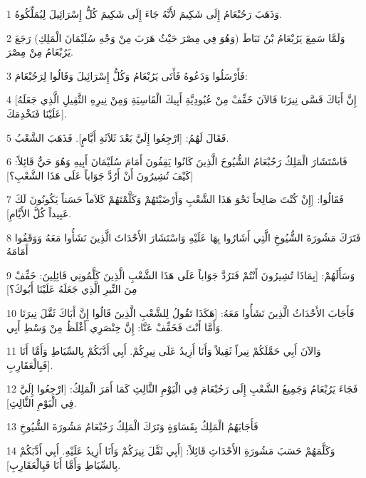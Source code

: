 \par 1 وَذَهَبَ رَحُبْعَامُ إِلَى شَكِيمَ لأَنَّهُ جَاءَ إِلَى شَكِيمَ كُلُّ إِسْرَائِيلَ لِيُمَلِّكُوهُ.
\par 2 وَلَمَّا سَمِعَ يَرُبْعَامُ بْنُ نَبَاطَ (وَهُوَ فِي مِصْرَ حَيْثُ هَرَبَ مِنْ وَجْهِ سُلَيْمَانَ الْمَلِكِ) رَجَعَ يَرُبْعَامُ مِنْ مِصْرَ.
\par 3 فَأَرْسَلُوا وَدَعُوهُ فَأَتَى يَرُبْعَامُ وَكُلُّ إِسْرَائِيلَ وَقَالُوا لِرَحُبْعَامَ:
\par 4 [إِنَّ أَبَاكَ قَسَّى نِيرَنَا فَالآنَ خَفِّفْ مِنْ عُبُودِيَّةِ أَبِيكَ الْقَاسِيَةِ وَمِنْ نِيرِهِ الثَّقِيلِ الَّذِي جَعَلَهُ عَلَيْنَا فَنَخْدِمَكَ].
\par 5 فَقَالَ لَهُمُ: [ارْجِعُوا إِلَيَّ بَعْدَ ثَلاَثَةِ أَيَّامٍ]. فَذَهَبَ الشَّعْبُ.
\par 6 فَاسْتَشَارَ الْمَلِكُ رَحُبْعَامُ الشُّيُوخَ الَّذِينَ كَانُوا يَقِفُونَ أَمَامَ سُلَيْمَانَ أَبِيهِ وَهُوَ حَيٌّ قَائِلاً: [كَيْفَ تُشِيرُونَ أَنْ أَرُدَّ جَوَاباً عَلَى هَذَا الشَّعْبِ؟]
\par 7 فَقَالُوا: [إِنْ كُنْتَ صَالِحاً نَحْوَ هَذَا الشَّعْبِ وَأَرْضَيْتَهُمْ وَكَلَّمْتَهُمْ كَلاَماً حَسَناً يَكُونُونَ لَكَ عَبِيداً كُلَّ الأَيَّامِ].
\par 8 فَتَرَكَ مَشُورَةَ الشُّيُوخِ الَّتِي أَشَارُوا بِهَا عَلَيْهِ وَاسْتَشَارَ الأَحْدَاثَ الَّذِينَ نَشَأُوا مَعَهُ وَوَقَفُوا أَمَامَهُ
\par 9 وَسَأَلَهُمْ: [بِمَاذَا تُشِيرُونَ أَنْتُمْ فَنَرُدَّ جَوَاباً عَلَى هَذَا الشَّعْبِ الَّذِينَ كَلَّمُونِي قَائِلِينَ: خَفِّفْ مِنَ النِّيرِ الَّذِي جَعَلَهُ عَلَيْنَا أَبُوكَ؟]
\par 10 فَأَجَابَ الأَحْدَاثُ الَّذِينَ نَشَأُوا مَعَهُ: [هَكَذَا تَقُولُ لِلشَّعْبِ الَّذِينَ قَالُوا إِنَّ أَبَاكَ ثَقَّلَ نِيرَنَا وَأَمَّا أَنْتَ فَخَفِّفْ عَنَّا: إِنَّ خِنْصَرِي أَغْلَظُ مِنْ وَسْطِ أَبِي.
\par 11 وَالآنَ أَبِي حَمَّلَكُمْ نِيراً ثَقِيلاً وَأَنَا أَزِيدُ عَلَى نِيرِكُمْ. أَبِي أَدَّبَكُمْ بِالسِّيَاطِ وَأَمَّا أَنَا فَبِالْعَقَارِبِ].
\par 12 فَجَاءَ يَرُبْعَامُ وَجَمِيعُ الشَّعْبِ إِلَى رَحُبْعَامَ فِي الْيَوْمِ الثَّالِثِ كَمَا أَمَرَ الْمَلِكُ: [ارْجِعُوا إِلَيَّ فِي الْيَوْمِ الثَّالِثِ].
\par 13 فَأَجَابَهُمُ الْمَلِكُ بِقَسَاوَةٍ وَتَرَكَ الْمَلِكُ رَحُبْعَامُ مَشُورَةَ الشُّيُوخِ
\par 14 وَكَلَّمَهُمْ حَسَبَ مَشُورَةِ الأَحْدَاثِ قَائِلاً: [أَبِي ثَقَّلَ نِيرَكُمْ وَأَنَا أَزِيدُ عَلَيْهِ. أَبِي أَدَّبَكُمْ بِالسِّيَاطِ وَأَمَّا أَنَا فَبِالْعَقَارِبِ].
